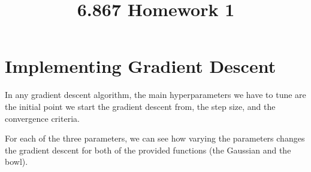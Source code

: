 \documentclass[8pt]{article}
\title{\vspace{-5ex} 6.867 Homework 1}
\author{}
\date{\vspace{-9ex}}
\begin{document}
\maketitle
\thispagestyle{fancy}



\section{Implementing Gradient Descent}

In any gradient descent algorithm, the main hyperparameters we have to tune are the initial point we start the gradient descent from, the step size, and the convergence criteria. 
%
%
%

For each of the three parameters, we can see how varying the parameters changes the gradient descent for both of the provided functions (the Gaussian and the bowl).
\end{document}
